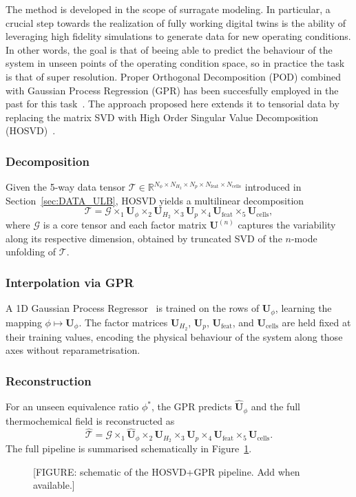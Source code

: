 The method is developed in the scope of surragate modeling. In particular, a crucial step towards the realization of fully working digital twins is the ability of leveraging high fidelity simulations to generate data for new operating conditions. In other words, the goal is that of beeing able to predict the behaviour of the system in unseen points of the operating condition space, so in practice the task is that of super resolution. Proper Orthogonal Decomposition (POD) combined with Gaussian Process Regression (GPR) has been succesfully employed in the past for this task~\cite{aversano2021digital}. The approach proposed here extends it to tensorial data by replacing the matrix SVD with High Order Singular Value Decomposition (HOSVD)~\cite{de2000multilinear}.

\subsubsection*{Decomposition}

Given the 5-way data tensor $\mathcal{T} \in \mathbb{R}^{N_\phi \times N_{H_2} \times N_p \times N_{\mathrm{feat}} \times N_{\mathrm{cells}}}$ introduced in Section~\ref{sec:DATA_ULB}, HOSVD yields a multilinear decomposition
\[
  \mathcal{T} = \mathcal{G}
    \times_1 \mathbf{U}_\phi
    \times_2 \mathbf{U}_{H_2}
    \times_3 \mathbf{U}_p
    \times_4 \mathbf{U}_{\mathrm{feat}}
    \times_5 \mathbf{U}_{\mathrm{cells}},
\]
where $\mathcal{G}$ is a core tensor and each factor matrix $\mathbf{U}^{(n)}$ captures the variability along its respective dimension, obtained by truncated SVD of the $n$-mode unfolding of $\mathcal{T}$.

\subsubsection*{Interpolation via GPR}

A 1D Gaussian Process Regressor~\cite{williams1995gaussian} is trained on the rows of $\mathbf{U}_\phi$, learning the mapping $\phi \mapsto \mathbf{U}_\phi$. The factor matrices $\mathbf{U}_{H_2}$, $\mathbf{U}_p$, $\mathbf{U}_{\mathrm{feat}}$, and $\mathbf{U}_{\mathrm{cells}}$ are held fixed at their training values, encoding the physical behaviour of the system along those axes without reparametrisation.

\subsubsection*{Reconstruction}

For an unseen equivalence ratio $\phi^*$, the GPR predicts $\hat{\mathbf{U}}_\phi$ and the full thermochemical field is reconstructed as
\[
  \hat{\mathcal{T}} = \mathcal{G}
    \times_1 \hat{\mathbf{U}}_\phi
    \times_2 \mathbf{U}_{H_2}
    \times_3 \mathbf{U}_p
    \times_4 \mathbf{U}_{\mathrm{feat}}
    \times_5 \mathbf{U}_{\mathrm{cells}}.
\]
The full pipeline is summarised schematically in Figure~\ref{fig:ulb_pipeline}.

\FloatBarrier
\begin{figure}[htbp]
    \centering
    \caption{[FIGURE: schematic of the HOSVD+GPR pipeline. Add when available.]}
    \label{fig:ulb_pipeline}
\end{figure}
\FloatBarrier
